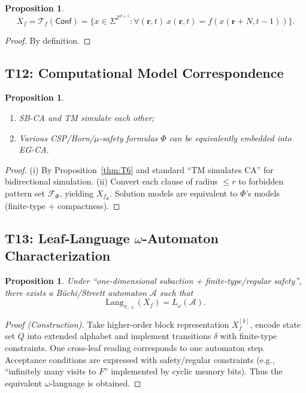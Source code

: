 \documentclass[11pt]{article}
\newtheorem{proposition}[theorem]{Proposition}
\theoremstyle{definition}
\theoremstyle{remark}
\begin{document}
\begin{proposition}\label{thm:T11}
\[
X_f = \mathcal{T}_f(\mathsf{Conf}) = \{x \in \Sigma^{\mathbb{Z}^{d+1}} : \forall (\mathbf{r}, t) \ x(\mathbf{r}, t) = f(x(\mathbf{r} + N, t-1))\}.
\]
\end{proposition}

\begin{proof}
By definition.
\end{proof}

\subsection{T12: Computational Model Correspondence}

\begin{proposition}\label{thm:T12}
\begin{enumerate}[label=(\roman*)]
\item SB-CA and TM simulate each other;
\item Various CSP/Horn/\( \mu \)-safety formulas \( \Phi \) can be equivalently embedded into EG-CA.
\end{enumerate}
\end{proposition}

\begin{proof}
(i) By Proposition~\ref{thm:T6} and standard ``TM simulates CA'' for bidirectional simulation.
(ii) Convert each clause of radius \( \leq r \) to forbidden pattern set \( \mathcal{F}_\Phi \), yielding \( X_{f_\Phi} \). Solution models are equivalent to \( \Phi \)'s models (finite-type + compactness).
\end{proof}

\subsection{T13: Leaf-Language \(\omega\)-Automaton Characterization}

\begin{proposition}\label{thm:T13}
Under ``one-dimensional subaction + finite-type/regular safety'', there exists a Büchi/Streett automaton \( \mathcal{A} \) such that
\[
\mathrm{Lang}_{\pi, \varsigma}(X_f) = L_\omega(\mathcal{A}).
\]
\end{proposition}

\begin{proof}[Proof (Construction)]
Take higher-order block representation \( X_f^{[k]} \), encode state set \( Q \) into extended alphabet and implement transitions \( \delta \) with finite-type constraints. One cross-leaf reading corresponds to one automaton step. Acceptance conditions are expressed with safety/regular constraints (e.g., ``infinitely many visits to \( F \)'' implemented by cyclic memory bits). Thus the equivalent \( \omega \)-language is obtained.
\end{proof}
\end{document}
